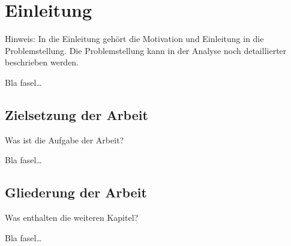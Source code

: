 
\chapter{Einleitung}
\label{ch:Einleitung}
Hinweis: In die Einleitung gehört die Motivation 
und Einleitung in die Problemstellung. Die Problemstellung
kann in der Analyse noch detaillierter beschrieben werden.

Bla fasel\ldots



\section{Zielsetzung der Arbeit}
\label{ch:Einleitung:sec:Zielsetzung}

Was ist die Aufgabe der Arbeit?

Bla fasel\ldots

\section{Gliederung der Arbeit}
\label{ch:Einleitung:sec:Gliederung}

Was enthalten die weiteren Kapitel?

Bla fasel\ldots

